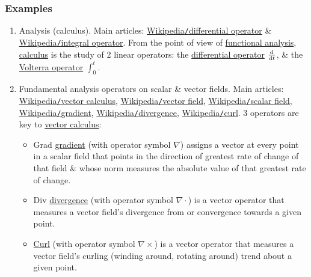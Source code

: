 \documentclass{article}
\begin{document}
\subsubsection{Examples}

\begin{enumerate}
	\item {\sf Analysis (calculus).} Main articles: \href{https://en.wikipedia.org/wiki/Differential_operator}{Wikipedia{\tt/}differential operator} \& \href{https://en.wikipedia.org/wiki/Integral_operator}{Wikipedia{\tt/}integral operator}. From the point of view of \href{https://en.wikipedia.org/wiki/Functional_analysis}{functional analysis}, \href{https://en.wikipedia.org/wiki/Calculus}{calculus} is the study of 2 linear operators: the \href{https://en.wikipedia.org/wiki/Differential_operator}{differential operator} $\frac{{\rm d}}{{\rm d}t}$, \& the \href{https://en.wikipedia.org/wiki/Volterra_operator}{Volterra operator} $\int_0^t$.
	\item {\sf Fundamental analysis operators on scalar \& vector fields.} Main articles: \href{https://en.wikipedia.org/wiki/Vector_calculus}{Wikipedia{\tt/}vector calculus}, \href{https://en.wikipedia.org/wiki/Vector_field}{Wikipedia{\tt/}vector field}, \href{https://en.wikipedia.org/wiki/Scalar_field}{Wikipedia{\tt/}scalar field}, \href{https://en.wikipedia.org/wiki/Gradient}{Wikipedia{\tt/}gradient}, \href{https://en.wikipedia.org/wiki/Divergence}{Wikipedia{\tt/}divergence}, \href{https://en.wikipedia.org/wiki/Curl_(mathematics)}{Wikipedia{\tt/}curl}. 3 operators are key to \href{https://en.wikipedia.org/wiki/Vector_calculus}{vector calculus}:
	\begin{itemize}
		\item Grad \href{https://en.wikipedia.org/wiki/Gradient}{gradient} (with operator symbol $\nabla$) assigns a vector at every point in a scalar field that points in the direction of greatest rate of change of that field \& whose norm measures the absolute value of that greatest rate of change.
		\item Div \href{https://en.wikipedia.org/wiki/Divergence}{divergence} (with operator symbol $\nabla\cdot$) is a vector operator that measures a vector field's divergence from or convergence towards a given point.
		\item \href{https://en.wikipedia.org/wiki/Curl_(mathematics)}{Curl} (with operator symbol $\nabla\times$) is a vector operator that measures a vector field's curling (winding around, rotating around) trend about a given point.
	\end{itemize}

\end{enumerate}
\end{document}
